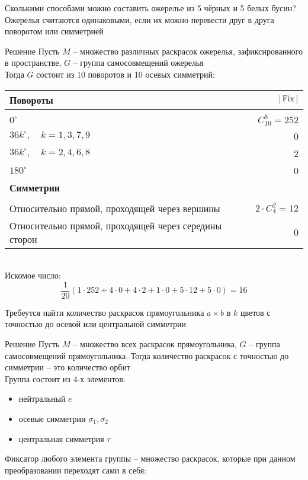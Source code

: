 \begin{exmpls}
	\item Сколькими способами можно составить ожерелье из 5 чёрных и 5 белых бусин? Ожерелья считаются одинаковыми, если их можно перевести друг в друга поворотом или симметрией
	\begin{undefthm}{Решение}
		Пусть $ M $ -- множество различных раскрасок ожерелья, зафиксированного в пространстве, $ G $ -- группа самосовмещений ожерелья \\
		Тогда $ G $ состоит из 10 поворотов и 10 осевых симметрий: \\
		\begin{tabular}{l | r}
			\textbf{Повороты} & $ |\operatorname{Fix}| $ \\
			\hline \\
			$ 0^\circ $ & $ C_{10}^5 = 252 $ \\
			$ 36k^\circ, \quad k = 1, 3, 7, 9 $ & 0 \\
			$ 36k^\circ, \quad k = 2, 4, 6, 8 $ & 2 \\
			$ 180^\circ $ & 0 \\
			\hline
			\textbf{Симметрии} \\
			\hline \\
			Относительно прямой, проходящей через вершины & $ 2 \cdot C_4^2 = 12 $ \\
			Относительно прямой, проходящей через середины сторон & 0
		\end{tabular} \\
		Искомое число:
		$$ \frac1{20}(1 \cdot 252 + 4 \cdot 0 + 4 \cdot 2 + 1 \cdot 0 + 5 \cdot 12 + 5 \cdot 0) = 16 $$
	\end{undefthm}
	\item Требеутся найти количество раскрасок прямоугольника $ a \times b $ в $ k $ цветов с точностью до осевой или центральной симметрии
	\begin{undefthm}{Решение}
		Пусть $ M $ -- множество всех раскрасок прямоугольника, $ G $ -- группа самосовмещений прямоугольника. Тогда количество раскрасок с точностью до симметрии -- это количество орбит \\
		Группа состоит из 4-х элементов:
		\begin{itemize}
			\item нейтральный $ e $
			\item осевые симметрии $ \sigma_1, \sigma_2 $
			\item центральная симметрия $ \tau $
		\end{itemize}
		Фиксатор любого элемента группы -- множество раскрасок, которые при данном преобразовании переходят сами в себя:

\end{undefthm}
\end{exmpls}
